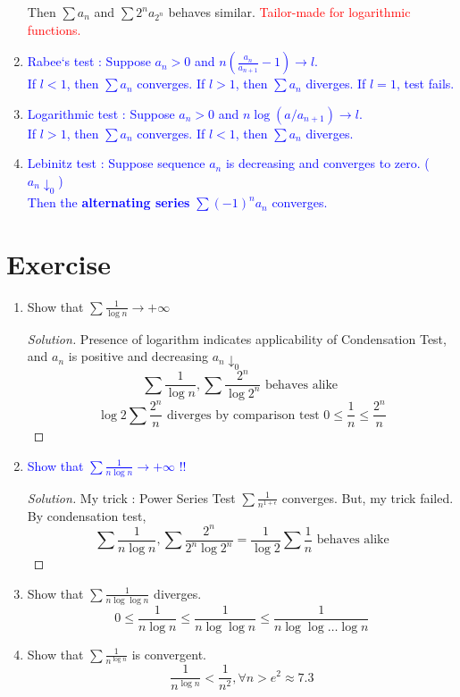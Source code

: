 \begin{enumerate}
{		Then $\sum a_n$ and $\sum 2^na_{2^n}$ behaves similar. \textcolor{red}{Tailor-made for logarithmic functions.}}
	\item \textcolor{blue}{Rabee`s test : Suppose $a_n > 0$ and $n\left(\frac{a_n}{a_{n+1}} -1 \right) \to l$.\\
		If $l < 1$, then $\sum a_n$ converges. If $l > 1$, then $\sum a_n$ diverges. If $l = 1$, test fails.}
	\item \textcolor{blue}{Logarithmic test : Suppose $a_n > 0$ and $n\log (a/a_{n+1}) \to l$.\\
		If $l > 1$, then $\sum a_n$ converges. If $l <1$, then $\sum a_n$ diverges.}
	\item \textcolor{blue}{Lebinitz test : Suppose sequence $a_n$ is decreasing and converges to zero. ($a_n \downarrow_0$)\\
		Then the \textbf{alternating series} $\sum (-1)^n a_n$ converges.}
\end{enumerate}

\section{Exercise}
\begin{enumerate}
	\item Show that $\sum \frac{1}{\log n} \to +\infty$ 
	\begin{proof}[Solution]
		Presence of logarithm indicates applicability of Condensation Test, and $a_n$ is positive and decreasing $a_n \downarrow_0$
		$$ \sum \frac{1}{\log n}, \sum \frac{2^n}{\log 2^n} \text{ behaves alike } $$
		$$ \log 2 \sum \frac{2^n}{n} \text{ diverges by comparison test } 0 \le \frac{1}{n} \le \frac{2^n}{n} $$
	\end{proof}
	\item \textcolor{blue}{Show that $\sum \frac{1}{n\log n} \to +\infty$ !!}
	\begin{proof}[Solution]
		My trick : Power Series Test $\sum \frac{1}{n^{1+\epsilon}}$ converges. But, my trick failed.\\
		By condensation test,
		$$ \sum \frac{1}{n\log n}, \sum \frac{2^n}{2^n \log 2^n} = \frac{1}{\log 2} \sum \frac{1}{n} \text{ behaves alike} $$
	\end{proof}
	\item Show that $\sum \frac{1}{n \log \log n}$ diverges.
		$$ 0 \le \frac{1}{n \log n} \le \frac{1}{n \log \log n} \le \frac{1}{n \log \log \dots \log n} $$
	\item Show that $\sum \frac{1}{n^{\log n}}$ is convergent.
	$$\frac{1}{n^{\log n}} < \frac{1}{n^2}, \forall n > e^2 \approx 7.3$$
\end{enumerate}
